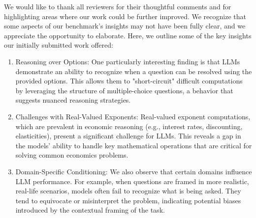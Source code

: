 \documentclass[12pt]{rebuttal_style}
\begin{document}




\begin{response}
    We would like to thank all reviewers for their thoughtful comments and for highlighting areas where our work could be further improved. We recognize that some aspects of our benchmark's insights may not have been fully clear, and we appreciate the opportunity to elaborate. Here, we outline some of the key insights our initially submitted work offered:
\begin{enumerate}
    \item Reasoning over Options: One particularly interesting finding is that LLMs demonstrate an ability to recognize when a question can be resolved using the provided options. This allows them to "short-circuit" difficult computations by leveraging the structure of multiple-choice questions, a behavior that suggests nuanced reasoning strategies.

    \item Challenges with Real-Valued Exponents: Real-valued exponent computations, which are prevalent in economic reasoning (e.g., interest rates, discounting, elasticities), present a significant challenge for LLMs. This reveals a gap in the models' ability to handle key mathematical operations that are critical for solving common economics problems.

    \item Domain-Specific Conditioning: We also observe that certain domains influence LLM performance. For example, when questions are framed in more realistic, real-life scenarios, models often fail to recognize what is being asked. They tend to equivocate or misinterpret the problem, indicating potential biases introduced by the contextual framing of the task.
\end{enumerate}
\end{response}

\vspace{0.5cm}
\makerule
\end{document}
